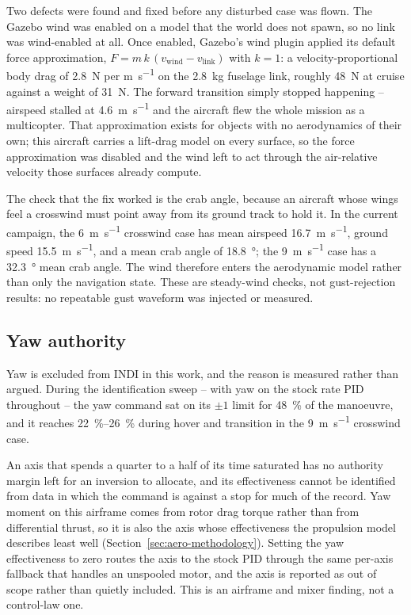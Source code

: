 \documentclass{article}
\begin{document}
Two defects were found and fixed before any disturbed case was flown. The Gazebo wind was enabled on a model that the world does not spawn, so no link was wind-enabled at all. Once enabled, Gazebo's wind plugin applied its default force approximation, $F = m\,k\,(v_\mathrm{wind} - v_\mathrm{link})$ with $k=1$: a velocity-proportional body drag of \SI{2.8}{\newton} per \si{\meter\per\second} on the \SI{2.8}{\kilogram} fuselage link, roughly \SI{48}{\newton} at cruise against a weight of \SI{31}{\newton}. The forward transition simply stopped happening -- airspeed stalled at \SI{4.6}{\meter\per\second} and the aircraft flew the whole mission as a multicopter. That approximation exists for objects with no aerodynamics of their own; this aircraft carries a lift-drag model on every surface, so the force approximation was disabled and the wind left to act through the air-relative velocity those surfaces already compute.

The check that the fix worked is the crab angle, because an aircraft whose wings feel a crosswind must point away from its ground track to hold it. In the current campaign, the \SI{6}{\meter\per\second} crosswind case has mean airspeed \SI{16.7}{\meter\per\second}, ground speed \SI{15.5}{\meter\per\second}, and a mean crab angle of \SI{18.8}{\degree}; the \SI{9}{\meter\per\second} case has a \SI{32.3}{\degree} mean crab angle. The wind therefore enters the aerodynamic model rather than only the navigation state. These are steady-wind checks, not gust-rejection results: no repeatable gust waveform was injected or measured.

\subsection{Yaw authority}
\label{sec:results-yaw}
Yaw is excluded from INDI in this work, and the reason is measured rather than argued. During the identification sweep -- with yaw on the stock rate PID throughout -- the yaw command sat on its $\pm1$ limit for \SI{48}{\percent} of the manoeuvre, and it reaches \SIrange{22}{26}{\percent} during hover and transition in the \SI{9}{\meter\per\second} crosswind case.

An axis that spends a quarter to a half of its time saturated has no authority margin left for an inversion to allocate, and its effectiveness cannot be identified from data in which the command is against a stop for much of the record. Yaw moment on this airframe comes from rotor drag torque rather than from differential thrust, so it is also the axis whose effectiveness the propulsion model describes least well (Section~\ref{sec:aero-methodology}). Setting the yaw effectiveness to zero routes the axis to the stock PID through the same per-axis fallback that handles an unspooled motor, and the axis is reported as out of scope rather than quietly included. This is an airframe and mixer finding, not a control-law one.
\end{document}
